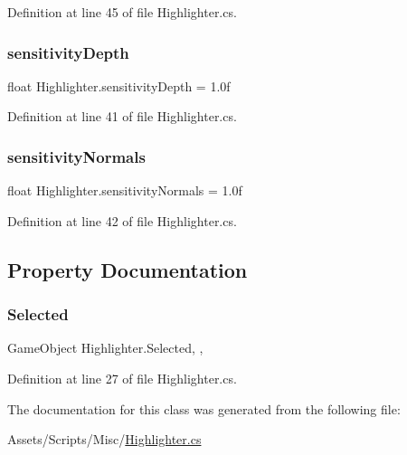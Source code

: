 Definition at line 45 of file Highlighter.\+cs.

\mbox{\label{class_highlighter_ab70ef9aa8d5990cf204dc0b24fa0de08}} 
\subsubsection{\texorpdfstring{sensitivity\+Depth}{sensitivityDepth}}
{\footnotesize\ttfamily float Highlighter.\+sensitivity\+Depth = 1.\+0f}



Definition at line 41 of file Highlighter.\+cs.

\mbox{\label{class_highlighter_a6264ca2df3047dcdd093f10b9d79e9e4}} 
\subsubsection{\texorpdfstring{sensitivity\+Normals}{sensitivityNormals}}
{\footnotesize\ttfamily float Highlighter.\+sensitivity\+Normals = 1.\+0f}



Definition at line 42 of file Highlighter.\+cs.



\subsection{Property Documentation}
\mbox{\label{class_highlighter_a3c59790cacc8f5149a3a642f67cd1168}} 
\subsubsection{\texorpdfstring{Selected}{Selected}}
{\footnotesize\ttfamily Game\+Object Highlighter.\+Selected\hspace{0.3cm}{\ttfamily [static]}, {\ttfamily [get]}, {\ttfamily [set]}}



Definition at line 27 of file Highlighter.\+cs.



The documentation for this class was generated from the following file\+:\begin{DoxyCompactItemize}
\item 
Assets/\+Scripts/\+Misc/\mbox{\hyperlink{_highlighter_8cs}{Highlighter.\+cs}}\end{DoxyCompactItemize}
